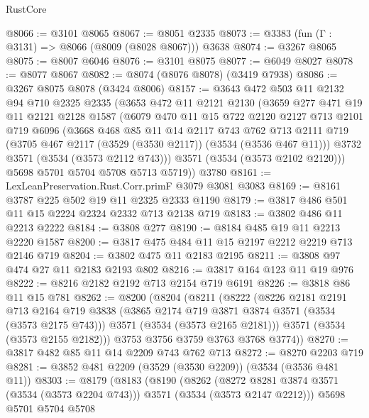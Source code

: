 \begin{lexlean}{RustCore}
\begin{coremodule}
@8066 := @3101 @8065
@8067 := @8051 @2335
@8073 := @3383 (fun (Γ : @3131) => @8066 (@8009 (@8028 @8067))) @3638
@8074 := @3267 @8065
@8075 := @8007 @6046
@8076 := @3101 @8075
@8077 := @6049 @8027
@8078 := @8077 @8067
@8082 := @8074 (@8076 @8078) (@3419 @7938)
@8086 := @3267 @8075 @8078 (@3424 @8006)
@8157 := @3643
    @472
    @503
    @11
    @2132
    @94
    @710
    @2325
    @2335
    (@3653
      @472
      @11
      @2121
      @2130
      (@3659
        @277
        @471
        @19
        @11
        @2121
        @2128
        @1587
        (@6079
          @470
          @11
          @15
          @722
          @2120
          @2127
          @713
          @2101
          @719
          @6096
          (@3668
            @468
            @85
            @11
            @14
            @2117
            @743
            @762
            @713
            @2111
            @719
            (@3705 @467 @2117 (@3529 (@3530 @2117)) (@3534 (@3536 @467 @11)))
            @3732
            @3571
            (@3534 (@3573 @2112 @743)))
          @3571
          (@3534 (@3573 @2102 @2120)))
        @5698
        @5701
        @5704
        @5708
        @5713
        @5719))
    @3780
@8161 := LexLeanPreservation.Rust.Corr.primF @3079 @3081 @3083
@8169 := @8161 @3787 @225 @502 @19 @11 @2325 @2333 @1190
@8179 := @3817 @486 @501 @11 @15 @2224 @2324 @2332 @713 @2138 @719
@8183 := @3802 @486 @11 @2213 @2222
@8184 := @3808 @277
@8190 := @8184 @485 @19 @11 @2213 @2220 @1587
@8200 := @3817 @475 @484 @11 @15 @2197 @2212 @2219 @713 @2146 @719
@8204 := @3802 @475 @11 @2183 @2195
@8211 := @3808 @97 @474 @27 @11 @2183 @2193 @802
@8216 := @3817 @164 @123 @11 @19 @976
@8222 := @8216 @2182 @2192 @713 @2154 @719 @6191
@8226 := @3818 @86 @11 @15 @781
@8262 := @8200
    (@8204
      (@8211
        (@8222
          (@8226
            @2181
            @2191
            @713
            @2164
            @719
            @3838
            (@3865 @2174 @719 @3871 @3874 @3571 (@3534 (@3573 @2175 @743)))
            @3571
            (@3534 (@3573 @2165 @2181)))
          @3571
          (@3534 (@3573 @2155 @2182)))
        @3753
        @3756
        @3759
        @3763
        @3768
        @3774))
@8270 := @3817 @482 @85 @11 @14 @2209 @743 @762 @713
@8272 := @8270 @2203 @719
@8281 := @3852 @481 @2209 (@3529 (@3530 @2209)) (@3534 (@3536 @481 @11))
@8303 := @8179
    (@8183
      (@8190
        (@8262
          (@8272 @8281 @3874 @3571 (@3534 (@3573 @2204 @743)))
          @3571
          (@3534 (@3573 @2147 @2212)))
        @5698
        @5701
        @5704
        @5708

\end{coremodule}
\end{lexlean}
